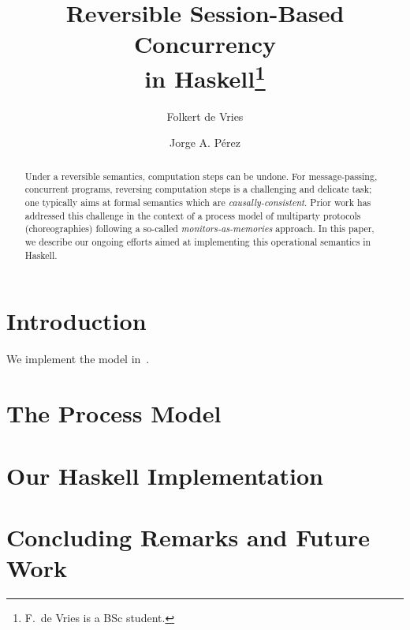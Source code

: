 \documentclass[runningheads]{llncs}
\begin{document}
%
\title{Reversible Session-Based Concurrency \\ in Haskell\thanks{F.\ de Vries is a BSc student.}}
%
%
\author{Folkert de Vries \and
Jorge A. P\'{e}rez}
%
%
%
\maketitle              %
%
\begin{abstract}
Under a reversible semantics, computation steps can be undone. 
For message-passing, concurrent programs, reversing computation steps is a challenging and delicate task; one typically aims at formal semantics which are \emph{causally-consistent}. 
Prior work has addressed this challenge in the context of a process model of multiparty protocols (choreographies) following a so-called \emph{monitors-as-memories} approach.
In this paper, we describe our ongoing efforts aimed at implementing this operational semantics in Haskell. 
\end{abstract}
%
%
%
\section{Introduction}
We implement the model in~\cite{DBLP:conf/ppdp/MezzinaP17}.

\section{The Process Model}

\section{Our Haskell Implementation}

\section{Concluding Remarks and Future Work}
%
%
%
 
 
%
\end{document}
